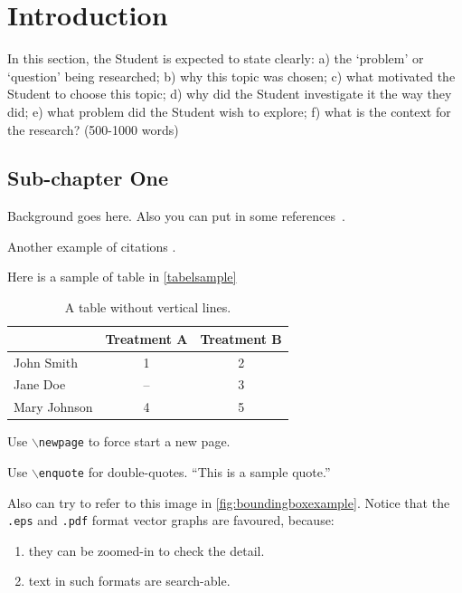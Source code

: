 
\chapter{Introduction}
\begin{spacing}{1.5}
\setlength{\parskip}{0.3in}

In this section, the Student is expected to state clearly:
a) the ‘problem’ or ‘question’ being researched;
b) why this topic was chosen;
c) what motivated the Student to choose this topic;
d) why did the Student investigate it the way they did;
e) what problem did the Student wish to explore;
f) what is the context for the research?
(500-1000 words)

\section{Sub-chapter One}


Background goes here. Also you can put in some references~\cite{ronneberger2015unet}.

Another example of citations \cite{latex2e,ronneberger2015unet}.

Here is a sample of table in \autoref{tabelsample}

\begin{table}[ht]
\centering
\caption{A table without vertical lines.}
\label{tabelsample}
\begin{tabular}[t]{lcc}
\toprule
&Treatment A&Treatment B\\
\midrule
John Smith&1&2\\
Jane Doe&--&3\\
Mary Johnson&4&5\\
\bottomrule
\end{tabular}
\end{table}%

Use  \texttt{$\backslash$newpage} to force start a new page.

\newpage
Use  \texttt{$\backslash$enquote} for double-quotes. \enquote{This is a sample quote.}

Also can try to refer to this image in \autoref{fig:boundingboxexample}. Notice that the \texttt{.eps} and \texttt{.pdf} format vector graphs are favoured, because:

\begin{enumerate}
    \item they can be zoomed-in to check the detail.
    \item text in such formats are search-able.
\end{enumerate}



\end{spacing}
